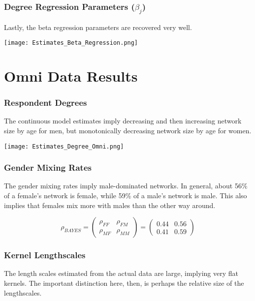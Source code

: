 \documentclass[12pt]{article}
\begin{document}
\subsubsection*{Degree Regression Parameters ($\beta_j$)}
\noindent Lastly, the beta regression parameters are recovered very well.

\begin{center}
\texttt{[image: Estimates\_Beta\_Regression.png]}
\end{center}

\pagebreak
\section{Omni Data Results}
\subsubsection*{Respondent Degrees}
The continuous model estimates imply decreasing and then increasing network size by age for men, but monotonically decreasing network size by age for women.

\begin{center}
\texttt{[image: Estimates\_Degree\_Omni.png]}
\end{center}

\subsubsection*{Gender Mixing Rates}
\noindent The gender mixing rates imply male-dominated networks. In general, about 56\% of a female's network is female, while 59\% of a male's network is male. This also implies that females mix more with males than the other way around.

$$ \rho_{BAYES}
= \left( \begin{array}{cc} \rho_{FF} & \rho_{FM} \\
\rho_{MF} & \rho_{MM} \end{array} \right) 
= \left( \begin{array}{cc}
0.44 & 0.56 \\
0.41 & 0.59 \end{array} \right) $$

\pagebreak
\subsubsection*{Kernel Lengthscales}
\noindent The length scales estimated from the actual data are large, implying very flat kernels. The important distinction here, then, is perhaps the relative size of the lengthscales.
\end{document}
